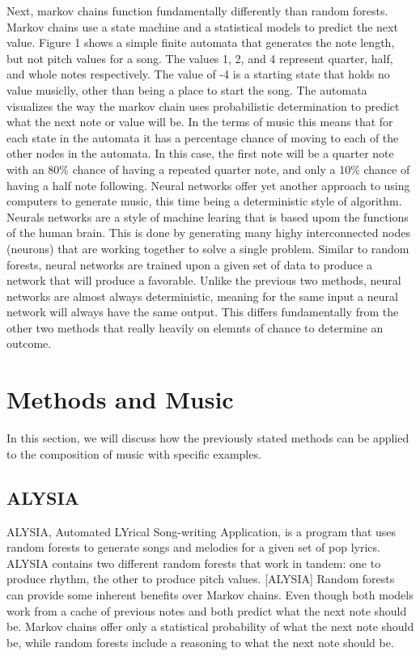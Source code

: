 \documentclass{sig-alternate}
\begin{document}
	Next, markov chains function fundamentally differently than random forests. Markov chains use a state machine and a statistical models to predict the next value. Figure 1 shows a simple finite automata that generates the note length, but not pitch values for a song. The values 1, 2, and 4 represent quarter, half, and whole notes respectively. The value of -4 is a starting state that holds no value musiclly, other than being a place to start the song. The automata visualizes the way the markov chain uses probabilistic determination to predict what the next note or value will be. In the terms of music this means that for each state in the automata it has a percentage chance of moving to each of the other nodes in the automata. In this case, the first note will be a quarter note with an 80\% chance of having a repeated quarter note, and only a 10\% chance of having a half note following.
	Neural networks offer yet another approach to using computers to generate music, this time being a deterministic style of algorithm. Neurals networks are a style of machine learing that is based upom the functions of the human brain. This is done by generating many highy interconnected nodes (neurons) that are working together to solve a single problem. Similar to random forests, neural networks are trained upon a given set of data to produce a network that will produce a favorable. Unlike the previous two methods, neural networks are almost always deterministic, meaning for the same input a neural network will always have the same output. This differs fundamentally from the other two methods that really heavily on elemnts of chance to determine an outcome. 
\section{Methods and Music}
	In this section, we will discuss how the previously stated methods can be applied to the composition of music with specific examples.
\subsection{ALYSIA}
\label{sec:ALYSIA}
	ALYSIA, Automated LYrical Song-writing Application, is a program that uses random forests to generate songs and melodies for a given set of pop lyrics. ALYSIA contains two different random forests that work in tandem: one to produce rhythm, the other to produce pitch values. [ALYSIA] Random forests can provide some inherent benefits over Markov chains. Even though both models work from a cache of previous notes and both predict what the next note should be. Markov chains offer only a statistical probability of what the next note should be, while random forests include a reasoning to what the next note should be. 
	
\end{document}
